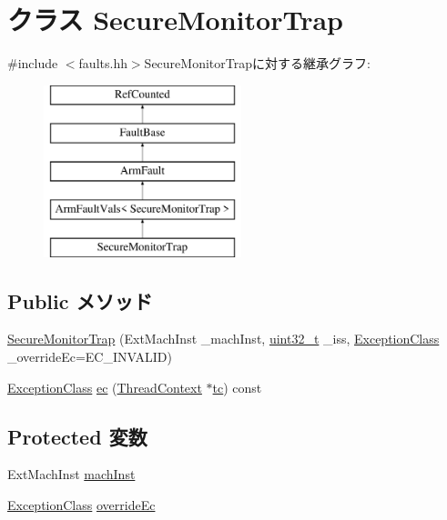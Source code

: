 \hypertarget{classArmISA_1_1SecureMonitorTrap}{
\section{クラス SecureMonitorTrap}
\label{classArmISA_1_1SecureMonitorTrap}
}


{\ttfamily \#include $<$faults.hh$>$}SecureMonitorTrapに対する継承グラフ:\begin{figure}[H]
\begin{center}
\leavevmode
\includegraphics[height=5cm]{classArmISA_1_1SecureMonitorTrap}
\end{center}
\end{figure}
\subsection*{Public メソッド}
\begin{DoxyCompactItemize}
\item 
\hyperlink{classArmISA_1_1SecureMonitorTrap_a9d7a16449817dcdbbd07d2c3e59c1309}{SecureMonitorTrap} (ExtMachInst \_\-machInst, \hyperlink{Type_8hh_a435d1572bf3f880d55459d9805097f62}{uint32\_\-t} \_\-iss, \hyperlink{namespaceArmISA_a04034d12009cf36227f4d2abff3331a2}{ExceptionClass} \_\-overrideEc=EC\_\-INVALID)
\item 
\hyperlink{namespaceArmISA_a04034d12009cf36227f4d2abff3331a2}{ExceptionClass} \hyperlink{classArmISA_1_1SecureMonitorTrap_aefab73b22a74d7c48b8a23230906d7cd}{ec} (\hyperlink{classThreadContext}{ThreadContext} $\ast$\hyperlink{namespaceArmISA_a5aff829af55e65b802d83dfcef4e9dd0}{tc}) const 
\end{DoxyCompactItemize}
\subsection*{Protected 変数}
\begin{DoxyCompactItemize}
\item 
ExtMachInst \hyperlink{classArmISA_1_1SecureMonitorTrap_a4a11fa8755d51be93a88861302a9378d}{machInst}
\item 
\hyperlink{namespaceArmISA_a04034d12009cf36227f4d2abff3331a2}{ExceptionClass} \hyperlink{classArmISA_1_1SecureMonitorTrap_af5e67d95019a0b5aba4c42205567eda7}{overrideEc}
\end{DoxyCompactItemize}


